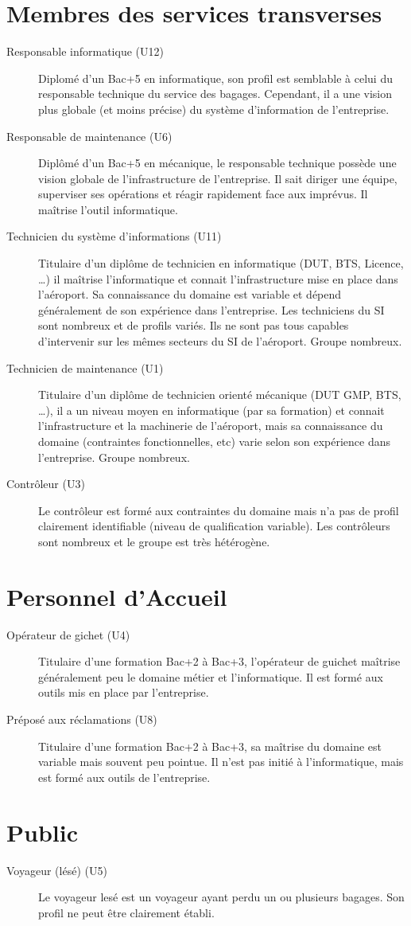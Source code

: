 \section{Membres des services transverses}
\begin{description}
\item[Responsable informatique (U12)] Diplomé d'un Bac+5 en informatique, son
profil est semblable à celui du responsable technique du service des bagages.
Cependant, il a une vision plus globale (et moins précise) du système
d'information de l'entreprise.
\item[Responsable de maintenance (U6)] Diplômé d'un Bac+5 en mécanique, le
responsable technique possède une vision globale de l'infrastructure de
l'entreprise. Il sait diriger une équipe, superviser ses opérations et réagir
rapidement face aux imprévus. Il maîtrise l'outil informatique.
\item[Technicien du système d'informations (U11)] Titulaire d'un diplôme de
technicien en informatique (DUT, BTS, Licence, \ldots) il maîtrise l'informatique et
connait l'infrastructure mise en place dans l'aéroport. Sa connaissance du
domaine est variable et dépend généralement de son expérience dans l'entreprise.
Les techniciens du SI sont nombreux et de profils variés. Ils ne sont pas tous
capables d'intervenir sur les mêmes secteurs du SI de l'aéroport. Groupe
nombreux.
\item[Technicien de maintenance (U1)] Titulaire d'un diplôme de technicien
orienté mécanique (DUT GMP, BTS, \ldots), il a un niveau moyen en informatique (par sa
formation) et connait l'infrastructure et la machinerie de l'aéroport, mais sa
connaissance du domaine (contraintes fonctionnelles, etc) varie selon son
expérience dans l'entreprise. Groupe nombreux. 
\item[Contrôleur (U3)] Le contrôleur est formé aux contraintes du domaine mais
n'a pas de profil clairement identifiable (niveau de qualification variable). Les
contrôleurs sont nombreux et le groupe est très hétérogène.
\end{description}

\section{Personnel d'Accueil}
\begin{description}
\item[Opérateur de gichet (U4)] Titulaire d'une formation Bac+2 à Bac+3,
l'opérateur de guichet maîtrise généralement peu le domaine métier et l'informatique. Il est
formé aux outils mis en place par l'entreprise.
\item[Préposé aux réclamations (U8)] Titulaire d'une formation Bac+2 à Bac+3, sa
maîtrise du domaine est variable mais souvent peu pointue. Il n'est pas initié à
l'informatique, mais est formé aux outils de l'entreprise.
\end{description}

\section{Public}
\begin{description}
\item[Voyageur (lésé) (U5)] Le voyageur lesé est un voyageur ayant perdu un ou
plusieurs bagages. Son profil ne peut être clairement établi.
\end{description}

